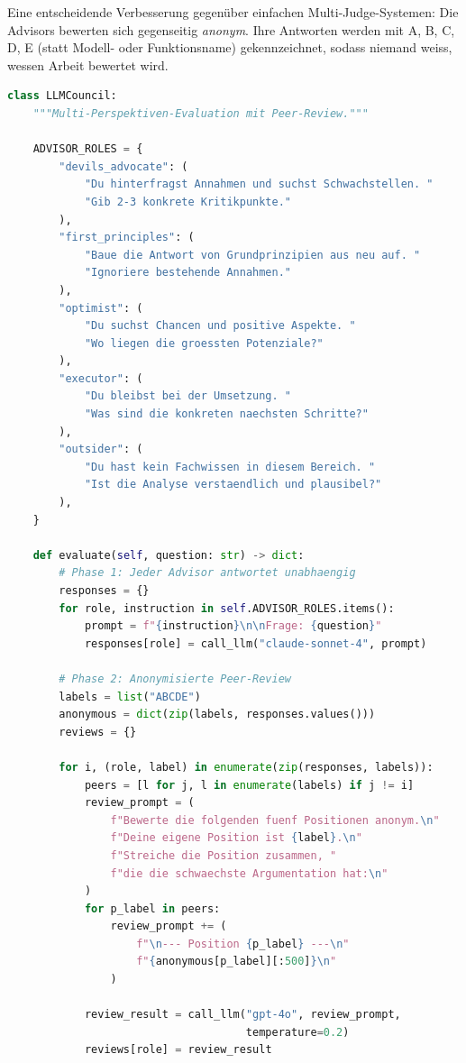 Eine entscheidende Verbesserung gegenüber einfachen Multi-Judge-Systemen: Die Advisors bewerten sich gegenseitig \textit{anonym}. Ihre Antworten werden mit A, B, C, D, E (statt Modell- oder Funktionsname) gekennzeichnet, sodass niemand weiss, wessen Arbeit bewertet wird.

\begin{lstlisting}[language=Python, caption=LLM Council mit anonymisierter Peer-Review]
class LLMCouncil:
    """Multi-Perspektiven-Evaluation mit Peer-Review."""

    ADVISOR_ROLES = {
        "devils_advocate": (
            "Du hinterfragst Annahmen und suchst Schwachstellen. "
            "Gib 2-3 konkrete Kritikpunkte."
        ),
        "first_principles": (
            "Baue die Antwort von Grundprinzipien aus neu auf. "
            "Ignoriere bestehende Annahmen."
        ),
        "optimist": (
            "Du suchst Chancen und positive Aspekte. "
            "Wo liegen die groessten Potenziale?"
        ),
        "executor": (
            "Du bleibst bei der Umsetzung. "
            "Was sind die konkreten naechsten Schritte?"
        ),
        "outsider": (
            "Du hast kein Fachwissen in diesem Bereich. "
            "Ist die Analyse verstaendlich und plausibel?"
        ),
    }

    def evaluate(self, question: str) -> dict:
        # Phase 1: Jeder Advisor antwortet unabhaengig
        responses = {}
        for role, instruction in self.ADVISOR_ROLES.items():
            prompt = f"{instruction}\n\nFrage: {question}"
            responses[role] = call_llm("claude-sonnet-4", prompt)

        # Phase 2: Anonymisierte Peer-Review
        labels = list("ABCDE")
        anonymous = dict(zip(labels, responses.values()))
        reviews = {}

        for i, (role, label) in enumerate(zip(responses, labels)):
            peers = [l for j, l in enumerate(labels) if j != i]
            review_prompt = (
                f"Bewerte die folgenden fuenf Positionen anonym.\n"
                f"Deine eigene Position ist {label}.\n"
                f"Streiche die Position zusammen, "
                f"die die schwaechste Argumentation hat:\n"
            )
            for p_label in peers:
                review_prompt += (
                    f"\n--- Position {p_label} ---\n"
                    f"{anonymous[p_label][:500]}\n"
                )

            review_result = call_llm("gpt-4o", review_prompt,
                                     temperature=0.2)
            reviews[role] = review_result


\end{lstlisting}
